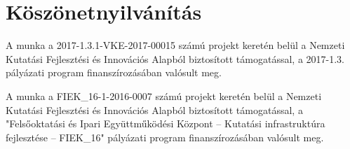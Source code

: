 \chapter*{Köszönetnyilvánítás}

A munka a 2017-1.3.1-VKE-2017-00015 számú projekt keretén belül a Nemzeti  Kutatási Fejlesztési és Innovációs Alapból biztosított támogatással, a 2017-1.3. pályázati program finanszírozásában valósult meg.

A munka a FIEK\_16-1-2016-0007 számú projekt keretén belül a Nemzeti  Kutatási Fejlesztési és Innovációs Alapból biztosított támogatással, a  "Felsőoktatási és Ipari Együttműködési Központ – Kutatási infrastruktúra  fejlesztése – FIEK\_16" pályázati program finanszírozásában valósult meg.